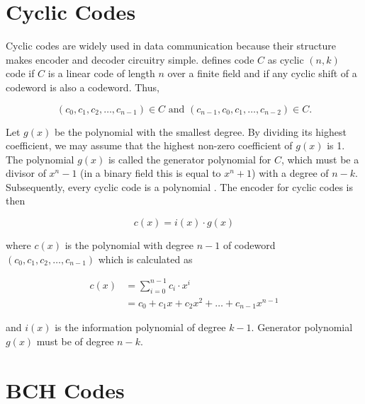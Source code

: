 \documentclass[../main.tex]{subfiles}
\begin{document}
    \section{Cyclic Codes}

    Cyclic codes are widely used in data communication because their structure makes encoder and decoder circuitry simple. \autocite{hill1986first} defines code $C$ as cyclic $(n,k)$ code if $C$ is a linear code of length $n$ over a finite field and if any cyclic shift of a codeword is also a codeword. Thus,

    \begin{equation*}
        (c_0, c_1, c_2, \dots, c_{n-1}) \in  C \text{ and } (c_{n-1}, c_0, c_1, \dots, c_{n-2}) \in C.
    \end{equation*}

    Let $g(x)$ be the polynomial with the smallest degree. By dividing its highest coefficient, we may assume that the highest non-zero coefficient of $g(x)$ is 1. The polynomial $g(x)$ is called the generator polynomial for $C$, which must be a divisor of $x^n-1$ (in a binary field this is equal to $x^n+1$) with a degree of $n-k$. Subsequently, every cyclic code is a polynomial \autocite{trappe2006introduction}. The encoder for cyclic codes is then

    \begin{equation*}
        c(x)=i(x) \cdot g(x)
    \end{equation*}

    \noindent
    where $c(x)$ is the polynomial with degree $n-1$ of codeword $(c_0, c_1, c_2, \dots, c_{n-1})$ which is calculated as

    \begin{align*}
        c(x) &= \sum_{i=0}^{n-1} c_i \cdot x^i\\
             &= c_0 + c_1x + c_2x^2 + \dots +  c_{n-1}x^{n-1}
    \end{align*}

    \noindent
    and $i(x)$ is the information polynomial of degree $k-1$. Generator polynomial $g(x)$ must be of degree $n-k$.


    \section{BCH Codes}
\end{document}
